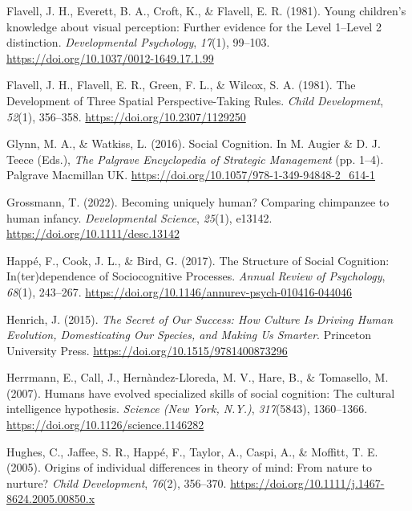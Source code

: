 \documentclass[
]{scrbook}
\newlength{\cslhangindent}
\newenvironment{CSLReferences}[2] %
 {\begin{list}{}{%
  \setlength{\itemindent}{0pt}
  \setlength{\leftmargin}{0pt}
  \setlength{\parsep}{0pt}
  \ifodd #1
   \setlength{\leftmargin}{\cslhangindent}
   \setlength{\itemindent}{-1\cslhangindent}
  \fi
  \setlength{\itemsep}{#2\baselineskip}}}
 {\end{list}}
\begin{document}
\begin{CSLReferences}{1}{0}
Flavell, J. H., Everett, B. A., Croft, K., \& Flavell, E. R. (1981). Young children's knowledge about visual perception: {Further} evidence for the {Level} 1--{Level} 2 distinction. \emph{Developmental Psychology}, \emph{17}(1), 99--103. \url{https://doi.org/10.1037/0012-1649.17.1.99}

Flavell, J. H., Flavell, E. R., Green, F. L., \& Wilcox, S. A. (1981). The {Development} of {Three Spatial Perspective-Taking Rules}. \emph{Child Development}, \emph{52}(1), 356--358. \url{https://doi.org/10.2307/1129250}

Glynn, M. A., \& Watkiss, L. (2016). Social {Cognition}. In M. Augier \& D. J. Teece (Eds.), \emph{The {Palgrave Encyclopedia} of {Strategic Management}} (pp. 1--4). Palgrave Macmillan UK. \url{https://doi.org/10.1057/978-1-349-94848-2_614-1}

Grossmann, T. (2022). Becoming uniquely human? {Comparing} chimpanzee to human infancy. \emph{Developmental Science}, \emph{25}(1), e13142. \url{https://doi.org/10.1111/desc.13142}

Happé, F., Cook, J. L., \& Bird, G. (2017). The {Structure} of {Social Cognition}: {In}(ter)dependence of {Sociocognitive Processes}. \emph{Annual Review of Psychology}, \emph{68}(1), 243--267. \url{https://doi.org/10.1146/annurev-psych-010416-044046}

Henrich, J. (2015). \emph{The {Secret} of {Our Success}: {How Culture Is Driving Human Evolution}, {Domesticating Our Species}, and {Making Us Smarter}}. Princeton University Press. \url{https://doi.org/10.1515/9781400873296}

Herrmann, E., Call, J., Hernàndez-Lloreda, M. V., Hare, B., \& Tomasello, M. (2007). Humans have evolved specialized skills of social cognition: The cultural intelligence hypothesis. \emph{Science (New York, N.Y.)}, \emph{317}(5843), 1360--1366. \url{https://doi.org/10.1126/science.1146282}

Hughes, C., Jaffee, S. R., Happé, F., Taylor, A., Caspi, A., \& Moffitt, T. E. (2005). Origins of individual differences in theory of mind: From nature to nurture? \emph{Child Development}, \emph{76}(2), 356--370. \url{https://doi.org/10.1111/j.1467-8624.2005.00850.x}


\end{CSLReferences}
\end{document}
